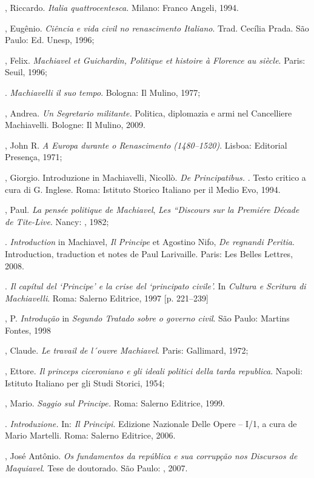 \begin{bibliohedra}
, Riccardo. \emph{Italia quattrocentesca.} Milano: Franco Angeli,
1994.

, Eugênio. \emph{Ciência e vida civil no renascimento Italiano}.
Trad. Cecília Prada. São Paulo: Ed. Unesp, 1996;

, Felix. \emph{Machiavel et Guichardin, Politique et histoire à
Florence au  siècle}. Paris: Seuil, 1996;

\titidem. \emph{Machiavelli il suo tempo}. Bologna: Il Mulino,
1977;

, Andrea. \emph{Un Segretario militante.} Politica, diplomazia e
armi nel Cancelliere Machiavelli. Bologne: Il Mulino, 2009.

, John R. \emph{A Europa durante o Renascimento (1480--1520)}.
Lisboa: Editorial Presença, 1971;

, Giorgio. Introduzione in Machiavelli, Nicollò. \emph{De
Principatibus.} . Testo critico a cura di G. Inglese. Roma: Istituto
Storico Italiano per il Medio Evo, 1994.

, Paul. \emph{La pensée politique de Machiavel}, \emph{Les
``Discours sur la Premiére Décade de Tite-Live}. Nancy: , 1982;

\titidem. \emph{Introduction} in Machiavel, \emph{Il Principe}
et Agostino Nifo, \emph{De regnandi Peritia}. Introduction, traduction
et notes de Paul Larivaille. Paris: Les Belles Lettres, 2008.

\titidem. \emph{Il capítul  del `Principe' e la crise del
`principato civile'.} In \emph{Cultura e Scritura di Machiavelli}. Roma:
Salerno Editrice, 1997 {[}p. 221--239{]}

, P. \emph{Introdução} in \emph{Segundo Tratado sobre o governo
civil}. São Paulo: Martins Fontes, 1998

, Claude. \emph{Le travail de l´ouvre Machiavel}. Paris:
Gallimard, 1972;

, Ettore. \emph{Il princeps ciceroniano e gli ideali politici
della tarda republica}. Napoli: Istituto Italiano per gli Studi Storici,
1954;

, Mario. \emph{Saggio sul Principe.} Roma: Salerno Editrice,
1999.

\titidem. \emph{Introduzione.} In: \emph{Il Principi}. Edizione
Nazionale Delle Opere -- I/1, a cura de Mario Martelli. Roma: Salerno
Editrice, 2006.

, José Antônio. \emph{Os fundamentos da república e sua corrupção
nos Discursos de Maquiavel}. Tese de doutorado. São Paulo: ,
2007.


\end{bibliohedra}
